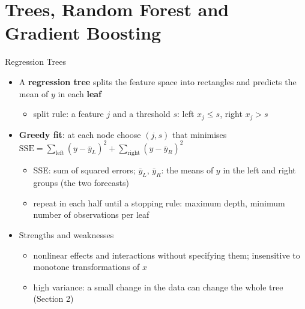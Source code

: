 \section{Trees, Random Forest and Gradient Boosting}

\begin{frame}{Regression Trees}
\itemsize{\small}
\begin{itemize}
    \item A \textbf{regression tree} splits the feature space into rectangles and predicts the mean of $y$ in each \textbf{leaf}
    \begin{itemize}
        \item split rule: a feature $j$ and a threshold $s$: left $x_j \le s$, right $x_j > s$
    \end{itemize}
    \item \textbf{Greedy fit}: at each node choose $(j, s)$ that minimises $\mathrm{SSE} = \sum_{\text{left}}(y - \bar y_L)^2 + \sum_{\text{right}}(y - \bar y_R)^2$
    \begin{itemize}
        \item SSE: sum of squared errors; $\bar y_L$, $\bar y_R$: the means of $y$ in the left and right groups (the two forecasts)
        \item repeat in each half until a stopping rule: maximum depth, minimum number of observations per leaf
    \end{itemize}
    \item Strengths and weaknesses
    \begin{itemize}
        \item nonlinear effects and interactions without specifying them; insensitive to monotone transformations of $x$
        \item high variance: a small change in the data can change the whole tree (Section 2)
    \end{itemize}
\end{itemize}
\end{frame}

